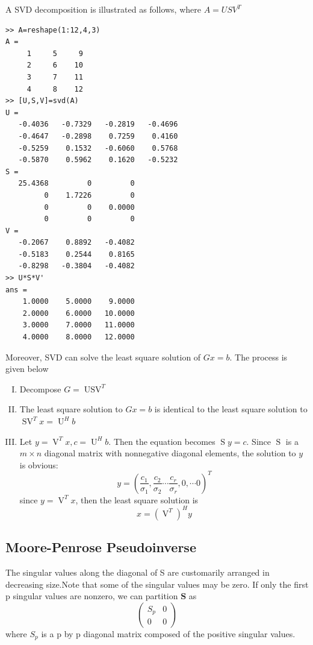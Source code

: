 \documentclass[a4paper]{article}
\newcommand{\tmop}[1]{\ensuremath{\operatorname{#1}}}
\newcommand{\tmstrong}[1]{\textbf{#1}}
\newenvironment{enumerateromancap}{\begin{enumerate}[I.] }{\end{enumerate}}
\begin{document}
A SVD decomposition is illustrated as follows, where $A=USV^T$

\begin{verbatim}
>> A=reshape(1:12,4,3)
A =
     1     5     9
     2     6    10
     3     7    11
     4     8    12
>> [U,S,V]=svd(A)
U =
   -0.4036   -0.7329   -0.2819   -0.4696
   -0.4647   -0.2898    0.7259    0.4160
   -0.5259    0.1532   -0.6060    0.5768
   -0.5870    0.5962    0.1620   -0.5232
S =
   25.4368         0         0
         0    1.7226         0
         0         0    0.0000
         0         0         0
V =
   -0.2067    0.8892   -0.4082
   -0.5183    0.2544    0.8165
   -0.8298   -0.3804   -0.4082
>> U*S*V'
ans =
    1.0000    5.0000    9.0000
    2.0000    6.0000   10.0000
    3.0000    7.0000   11.0000
    4.0000    8.0000   12.0000
\end{verbatim}

Moreover, SVD can solve the least square solution of $Gx=b$. The process is given below
\begin{enumerateromancap}
  \item Decompose $G = \tmop{USV}^T$

  \item The least square solution to $Gx=b$ is identical to the least square solution to $\tmop{SV}^Tx=\tmop{U}^Hb$

  \item Let $y=\tmop{V}^Tx,c=\tmop{U}^Hb$. Then the equation becomes $\tmop{S}y=c$. Since $\tmop{S}$ is a $m\times n$ diagonal matrix with nonnegative diagonal elements, the solution to $y$ is obvious:
      \[y = {\left( {\frac{{{c_1}}}{{{\sigma _1}}},\frac{{{c_2}}}{{{\sigma _2}}} \cdots \frac{{{c_r}}}{{{\sigma _r}}},0, \cdots 0} \right)^T}\]
      since $y=\tmop{V}^Tx$, then the least square solution is
      \begin{equation}
      x = {\left( {{\tmop{V}^T}} \right)^H}y
      \end{equation}

\end{enumerateromancap}


\subsection{Moore-Penrose Pseudoinverse}

The singular values along the diagonal of S are customarily arranged in
decreasing size.Note that some of the singular values may be zero. If only the
first p singular values are nonzero, we can partition {\tmstrong{S}} as
\[ \left(\begin{array}{cc}
     S_p  & 0\\
     0 & 0
   \end{array}\right) \]
where $S_p$ is a p by p diagonal matrix composed of the positive singular
values.
\end{document}
